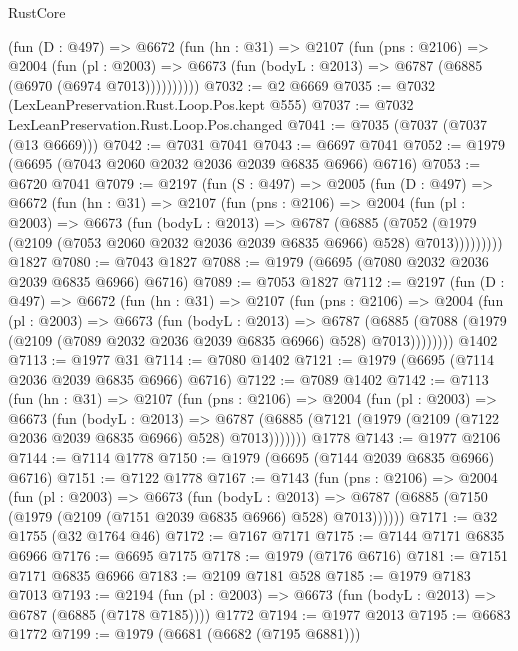 \begin{lexlean}{RustCore}
\begin{coremodule}
        (fun (D : @497) =>
        @6672
          (fun (hn : @31) =>
          @2107
            (fun (pns : @2106) =>
            @2004
              (fun (pl : @2003) =>
              @6673 (fun (bodyL : @2013) => @6787 (@6885 (@6970 (@6974 @7013))))))))))
@7032 := @2 @6669
@7035 := @7032 (LexLeanPreservation.Rust.Loop.Pos.kept @555)
@7037 := @7032 LexLeanPreservation.Rust.Loop.Pos.changed
@7041 := @7035 (@7037 (@7037 (@13 @6669)))
@7042 := @7031 @7041
@7043 := @6697 @7041
@7052 := @1979 (@6695 (@7043 @2060 @2032 @2036 @2039 @6835 @6966) @6716)
@7053 := @6720 @7041
@7079 := @2197
    (fun (S : @497) =>
    @2005
      (fun (D : @497) =>
      @6672
        (fun (hn : @31) =>
        @2107
          (fun (pns : @2106) =>
          @2004
            (fun (pl : @2003) =>
            @6673
              (fun (bodyL : @2013) =>
              @6787
                (@6885
                  (@7052
                    (@1979 (@2109 (@7053 @2060 @2032 @2036 @2039 @6835 @6966) @528) @7013)))))))))
    @1827
@7080 := @7043 @1827
@7088 := @1979 (@6695 (@7080 @2032 @2036 @2039 @6835 @6966) @6716)
@7089 := @7053 @1827
@7112 := @2197
    (fun (D : @497) =>
    @6672
      (fun (hn : @31) =>
      @2107
        (fun (pns : @2106) =>
        @2004
          (fun (pl : @2003) =>
          @6673
            (fun (bodyL : @2013) =>
            @6787
              (@6885 (@7088 (@1979 (@2109 (@7089 @2032 @2036 @2039 @6835 @6966) @528) @7013))))))))
    @1402
@7113 := @1977 @31
@7114 := @7080 @1402
@7121 := @1979 (@6695 (@7114 @2036 @2039 @6835 @6966) @6716)
@7122 := @7089 @1402
@7142 := @7113
    (fun (hn : @31) =>
    @2107
      (fun (pns : @2106) =>
      @2004
        (fun (pl : @2003) =>
        @6673
          (fun (bodyL : @2013) =>
          @6787 (@6885 (@7121 (@1979 (@2109 (@7122 @2036 @2039 @6835 @6966) @528) @7013)))))))
    @1778
@7143 := @1977 @2106
@7144 := @7114 @1778
@7150 := @1979 (@6695 (@7144 @2039 @6835 @6966) @6716)
@7151 := @7122 @1778
@7167 := @7143
    (fun (pns : @2106) =>
    @2004
      (fun (pl : @2003) =>
      @6673
        (fun (bodyL : @2013) =>
        @6787 (@6885 (@7150 (@1979 (@2109 (@7151 @2039 @6835 @6966) @528) @7013))))))
@7171 := @32 @1755 (@32 @1764 @46)
@7172 := @7167 @7171
@7175 := @7144 @7171 @6835 @6966
@7176 := @6695 @7175
@7178 := @1979 (@7176 @6716)
@7181 := @7151 @7171 @6835 @6966
@7183 := @2109 @7181 @528
@7185 := @1979 @7183 @7013
@7193 := @2194
    (fun (pl : @2003) => @6673 (fun (bodyL : @2013) => @6787 (@6885 (@7178 @7185))))
    @1772
@7194 := @1977 @2013
@7195 := @6683 @1772
@7199 := @1979 (@6681 (@6682 (@7195 @6881)))

\end{coremodule}
\end{lexlean}
